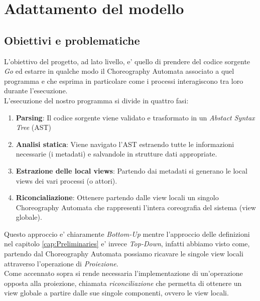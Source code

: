 \chapter{Adattamento del modello}
\section{Obiettivi e problematiche}
L'obiettivo del progetto, ad lato livello, e' quello di prendere del codice sorgente \emph{Go} ed estarre in qualche modo il Choreography Automata associato a quel programma e che esprima in particolare come i processi interagiscono tra loro durante l'esecuzione.\\
L'esecuzione del nostro programma si divide in quattro fasi:
\begin{enumerate}
    \item \textbf{Parsing}: Il codice sorgente viene validato e trasformato in un \emph{Abstact Syntax Tree} (AST)
    \item \textbf{Analisi statica}: Viene navigato l'AST estraendo tutte le informazioni necessarie (i metadati) e salvandole in strutture dati appropriate.
    \item \textbf{Estrazione delle local views}: Partendo dai metadati si generano le local views dei vari processi (o attori).
    \item \textbf{Riconcialiazione}: Ottenere partendo dalle view locali un singolo Choreography Automata che rappresenti l'intera coreografia del sistema (view globale).
\end{enumerate}
Questo approccio e' chiaramente \emph{Bottom-Up} mentre l'approccio delle definizioni nel capitolo \ref{cap:Preliminaries} e' invece \emph{Top-Down}, infatti abbiamo visto come, partendo dal Choreography Automata possiamo ricavare le singole view locali attraverso l'operazione di \emph{Proiezione}.\\
Come accennato sopra si rende necessaria l'implementazione di un'operazione opposta alla proiezione, chiamata \emph{riconciliazione} che permetta di ottenere un view globale a partire dalle sue singole componenti, ovvero le view locali.

